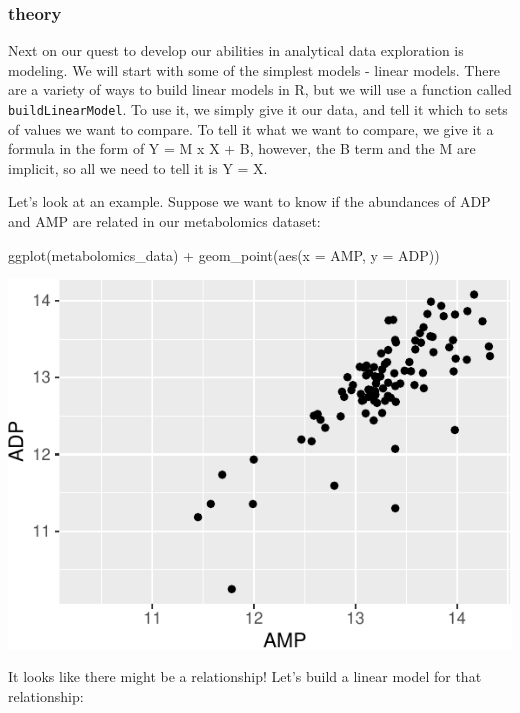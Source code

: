 \documentclass[
]{krantz}
\newenvironment{Shaded}{\begin{snugshade}}{\end{snugshade}}
\newcommand{\AttributeTok}[1]{\textcolor[rgb]{0.77,0.63,0.00}{#1}}
\newcommand{\FunctionTok}[1]{\textcolor[rgb]{0.00,0.00,0.00}{#1}}
\newcommand{\NormalTok}[1]{#1}
\newcommand{\SpecialCharTok}[1]{\textcolor[rgb]{0.00,0.00,0.00}{#1}}
\begin{document}
\hypertarget{theory-2}{%
\subsubsection{theory}\label{theory-2}}

Next on our quest to develop our abilities in analytical data exploration is modeling. We will start with some of the simplest models - linear models. There are a variety of ways to build linear models in R, but we will use a function called \texttt{buildLinearModel}. To use it, we simply give it our data, and tell it which to sets of values we want to compare. To tell it what we want to compare, we give it a formula in the form of Y = M x X + B, however, the B term and the M are implicit, so all we need to tell it is Y = X.

Let's look at an example. Suppose we want to know if the abundances of ADP and AMP are related in our metabolomics dataset:

\begin{Shaded}
\begin{Highlighting}[]
\FunctionTok{ggplot}\NormalTok{(metabolomics\_data) }\SpecialCharTok{+}
  \FunctionTok{geom\_point}\NormalTok{(}\FunctionTok{aes}\NormalTok{(}\AttributeTok{x =}\NormalTok{ AMP, }\AttributeTok{y =}\NormalTok{ ADP))}
\end{Highlighting}
\end{Shaded}

\begin{center}\includegraphics[width=0.8\linewidth]{index_files/figure-latex/unnamed-chunk-120-1} \end{center}

It looks like there might be a relationship! Let's build a linear model for that relationship:
\end{document}
